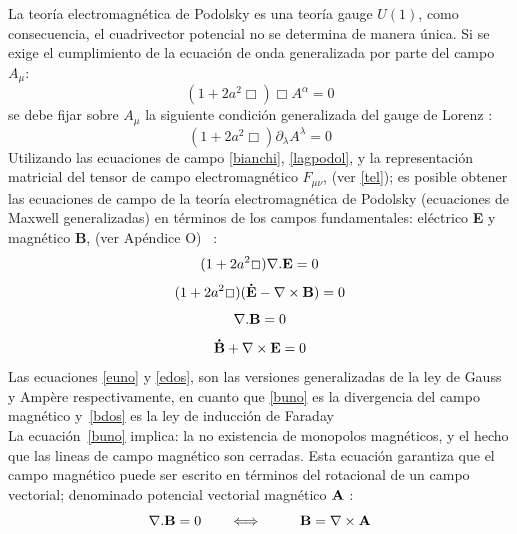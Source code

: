 \documentclass[a4paper,12pt]{article}
\begin{document}
La teoría electromagnética de Podolsky es una teoría gauge $U(1)$, como consecuencia, el cuadrivector potencial no se determina de manera única. Si se exige el cumplimiento de la ecuación de onda generalizada por parte del campo $A_\mu$:
\begin{equation}
(1+2a^2\Box)\Box A^\alpha=0 
\label{poon}
\end{equation}
se debe fijar sobre $A_\mu$ la siguiente condición generalizada del gauge de Lorenz \cite{podolsky} :
\begin{equation}
(1+2a^2\Box)\partial_\lambda A^\lambda=0 
\label{gaulo}
\end{equation}
Utilizando las ecuaciones de campo \eqref{bianchi}, \eqref{lagpodol}, y la representación matricial del tensor de campo electromagnético $F_{\mu\nu}$, (ver \eqref{tel}); es posible obtener las ecuaciones de campo de la teoría electromagnética de Podolsky (ecuaciones de Maxwell generalizadas) en términos de los campos fundamentales: eléctrico {\bf E} y magnético {\bf B}, (ver Apéndice O) \mbox{ \cite{podolsky, podolfuerza}:}
\begin{equation}
(1+2a^2\Box)\nabla{\bf.E}=0
\label{euno}
\end{equation}
\begin{equation}
(1+2a^2\Box){\bf (\dot E-\nabla \times B)}=0
\label{edos}
\end{equation}
\begin{equation}
{\bf \nabla.B}=0
\label{buno}
\end{equation}
\begin{equation}
 {\bf \dot B+\nabla \times E}=0
\label{bdos}
\end{equation}
Las ecuaciones \eqref{euno} y \eqref{edos}, son las versiones generalizadas de la ley de Gauss y Ampère respectivamente, en cuanto que \eqref{buno} es la divergencia del campo magnético \mbox{y \eqref{bdos}} es la ley de inducción de Faraday
\\

La \mbox{ecuación \eqref{buno}} implica: la no existencia de monopolos magnéticos, y el hecho que las lineas de campo magnético son cerradas. Esta ecuación garantiza que el campo magnético puede ser escrito en términos del rotacional de un campo vectorial; denominado potencial vectorial magnético ${\bf A}$ \cite{elec}:
\begin{equation}
{\bf \nabla.B}=0 \ \ \ \ \ \    \Longleftrightarrow \ \ \ \ \ \ \ \ {\bf B}=\nabla \times {\bf A} 
\label{ponvec}
\end{equation}
\end{document}
